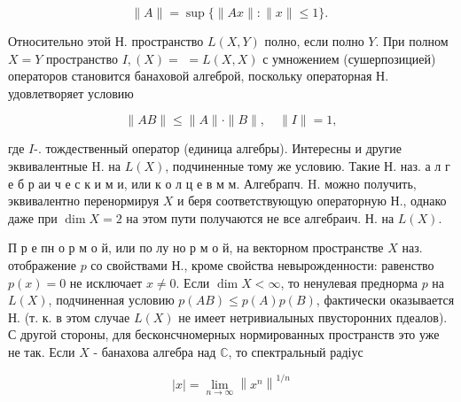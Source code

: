 \documentclass[10pt]{article}
\begin{document}
\[

\|A\|=\sup \{\|A x\|:\|x\| \leqslant 1\} \text {. }

\]



Относительно этой Н. пространство $L(X, Y)$ полно, если полно $Y$. При полном $X=Y$ пространство $I,(X)=$ $=L(X, X)$ с умножением (сушерпозицией) операторов становится банаховой алгеброй, поскольку операторная Н. удовлетворяет условию



\[

\|A B\| \leqslant\|A\| \cdot\|B\|, \quad\|I\|=1,

\]



где $I$-. тождественный оператор (единица алгебры). Интересны и другие эквивалентные H. на $L(X)$, подчиненные тому же условию. Такие Н. наз. а л г е б р аи ч е с к и м и, или к о л ц е в м м. Алгебрапч. H. можно получить, эквивалентно перенормируя $X$ и беря соответствующую операторную Н., однако даже при $\operatorname{dim} X=2$ на этом пути получаются не все алгебраич. Н. на $L(X)$.



П р е пн о р м о й, или по лу но р м о й, на векторном пространстве $X$ наз. отображение $p$ со свойствами Н., кроме свойства невырожденности: равенство $p(x)=0$ не исключает $x \neq 0$. Если $\operatorname{dim} X<\infty$, то ненулевая преднорма $p$ на $L(X)$, подчиненная условию $p(A B) \leqslant p(A) p(B)$, фактически оказывается Н. (т. к. в этом случае $L(X)$ не имеет нетривиалыных пвусторонних пдеалов). С другой стороны, для бесконсчномерных нормированных пространств это уже не так. Если $X$ - банахова алгебра над $\mathbb{C}$, то спектральный радіус



\[

|x|=\lim _{n \rightarrow \infty}\left\|x^{n}\right\|^{1 / n}

\]
\end{document}
